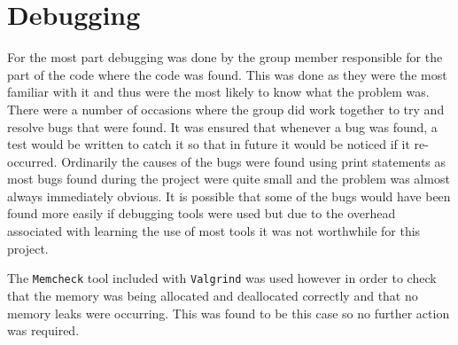 \section{Debugging}
For the most part debugging was done by the group member responsible for the part of the code where the code was found.
This was done as they were the most familiar with it and thus were the most likely to know what the problem was.
There were a number of occasions where the group did work together to try and resolve bugs that were found.
It was ensured that whenever a bug was found, a test would be written to catch it so that in future it would be noticed if it re-occurred.
Ordinarily the causes of the bugs were found using print statements as most bugs found during the project were quite small and the problem was almost always immediately obvious.
It is possible that some of the bugs would have been found more easily if debugging tools were used but due to the overhead associated with learning the use of most tools it was not worthwhile for this project.

The \texttt{Memcheck} tool included with \texttt{Valgrind} was used however in order to check that the memory was being allocated and deallocated correctly and that no memory leaks were occurring.
This was found to be this case so no further action was required.
